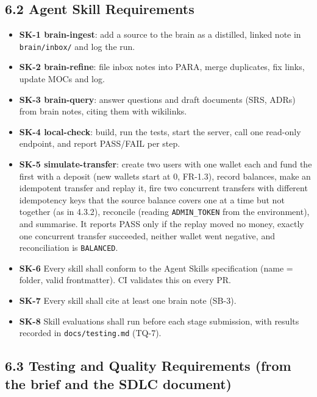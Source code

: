\documentclass[11pt,a4paper]{article}
\providecommand{\tightlist}{\setlength{\itemsep}{2pt}\setlength{\parskip}{0pt}}
\begin{document}
\subsection{6.2 Agent Skill Requirements}\label{agent-skill-requirements}

\begin{itemize}
\tightlist
\item
  \textbf{SK-1 brain-ingest}: add a source to the brain as a distilled, linked note in \texttt{brain/\allowbreak{}inbox/\allowbreak{}}
  and log the run.
\item
  \textbf{SK-2 brain-refine}: file inbox notes into PARA, merge duplicates, fix links, update MOCs and
  log.
\item
  \textbf{SK-3 brain-query}: answer questions and draft documents (SRS, ADRs) from brain notes, citing
  them with wikilinks.
\item
  \textbf{SK-4 local-check}: build, run the tests, start the server, call one read-only endpoint, and
  report PASS/FAIL per step.
\item
  \textbf{SK-5 simulate-transfer}: create two users with one wallet each and fund the first with a
  deposit (new wallets start at 0, FR-1.3), record balances, make an idempotent transfer and replay
  it, fire two concurrent transfers with different idempotency keys that the source balance covers
  one at a time but not together (as in 4.3.2), reconcile (reading \texttt{ADMIN\_\allowbreak{}TOKEN} from the
  environment), and summarise. It reports PASS only if the replay moved no money, exactly one
  concurrent transfer succeeded, neither wallet went negative, and reconciliation is \texttt{BALANCED}.
\item
  \textbf{SK-6} Every skill shall conform to the Agent Skills specification (name = folder, valid
  frontmatter). CI validates this on every PR.
\item
  \textbf{SK-7} Every skill shall cite at least one brain note (SB-3).
\item
  \textbf{SK-8} Skill evaluations shall run before each stage submission, with results recorded in
  \texttt{docs/\allowbreak{}testing.md} (TQ-7).
\end{itemize}

\subsection{6.3 Testing and Quality Requirements (from the brief and the SDLC document)}\label{testing-and-quality-requirements-from-the-brief-and-the-sdlc-document}
\end{document}
